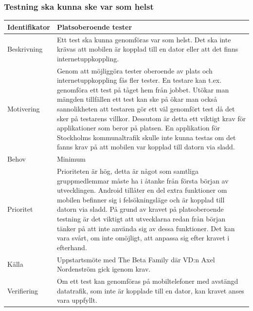 \subsubsection{Testning ska kunna ske var som helst}
\begin{tabular}{ | p{65pt} | p{300pt} |}
  \hline
  Identifikator & 
  Platsoberoende tester
  \\ \hline
  Beskrivning & 
  Ett test ska kunna genomföras var som helst. Det ska inte krävas att mobilen är kopplad till en dator eller att det finns internetuppkoppling.
  \\ \hline
  Motivering &
  Genom att möjliggöra tester oberoende av plats och internetuppkoppling fås fler tester. En testare kan t.ex. genomföra ett test på tåget hem från jobbet. Utökar man mängden tillfällen ett test kan ske på ökar man också sannolikheten att testaren gör ett väl genomfört test då det sker på testarens villkor. Dessutom är detta ett viktigt krav för applikationer som beror på platsen. En applikation för Stockholms kommunaltrafik skulle inte kunna testas om det fanns krav på att mobilen var kopplad till datorn via sladd.
  \\ \hline
  Behov &
Minimum
  \\ \hline
  Prioritet &
Prioriteten är hög, detta är något som samtliga gruppmedlemmar måste ha i åtanke från första början av utvecklingen. Android tillåter en del extra funktioner om mobilen befinner sig i felsökningsläge och är kopplad till datorn via sladd. På grund av kravet på platsoberoende testning är det viktigt att utvecklarna redan från början tänker på att inte använda sig av dessa funktioner. Det kan vara svårt, om inte omöjligt, att anpassa sig efter kravet i efterhand.
  \\ \hline
  Källa &
 Uppstartsmöte med The Beta Family där VD:n Axel Nordenström gick igenom krav.
  \\ \hline
  Verifiering &
  Om ett test kan genomföras på mobiltelefoner med avstängd datatrafik, som inte är kopplade till en dator, kan kravet anses vara uppfyllt.
  \\ \hline
\end{tabular}

